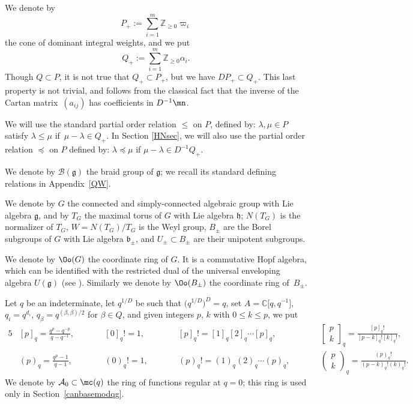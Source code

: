 We denote by
\[ P_+:= \sum_{i=1}^m \mathbb{Z}_{\geq 0} \varpi_i
\]
 the cone of dominant integral weights, and we put
 \[ Q_+:= \sum_{i=1}^m \mathbb{Z}_{\geq 0} \alpha_i.\]
 Though $Q\subset P$, it is not true that $Q_+\subset P_+$, but we have $DP_+ \subset Q_+$. This last property is not trivial, and follows from the classical fact that the inverse of the Cartan matrix~$(a_{ij})$ has coefficients in $D^{-1}\mn$.

We will use the standard partial order relation $\leq$ on $P$, defined by: $\lambda, \mu\in P$ satisfy $\lambda \leq \mu$ if~${\mu-\lambda \in Q_+}$. In Section \ref{HNsec}, we will also use the partial order relation $\preceq$ on $P$ defined by: $\lambda \preceq \mu$ if $\mu-\lambda \in D^{-1}Q_+$.

We denote by $\mathcal{B}(\mathfrak{g})$ the braid group of $\mathfrak{g}$; we recall its standard defining relations in Appendix~\ref{QW}.

We denote by $G$ the connected and simply-connected algebraic group with Lie algebra $\mathfrak{g}$, and by $T_G$ the maximal torus of $G$ with Lie algebra $\mathfrak{h}$; $N(T_G)$ is the normalizer of $T_G$, $W = N(T_G)/T_G$ is the Weyl group, $B_\pm$ are the Borel subgroups of $G$ with Lie algebra $\mathfrak{b}_\pm$, and $U_\pm \subset B_\pm$ are their unipotent subgroups.

We denote by $\Oo(G)$ the coordinate ring of $G$. It is a commutative Hopf algebra, which can be identified with the restricted dual of the universal enveloping algebra $U(\mathfrak{g})$ (see \cite{Ko,Lusztig3}). Similarly we denote by $\Oo(B_\pm)$ the coordinate ring of~$B_\pm$.

Let $q$ be an indeterminate, let $q^{1/D}$ be such that $\bigl(q^{1/D}\bigr)^D=q$, set $A={\mathbb C}\big[q,q^{-1}\big]$, $q_i=q^{d_i}$, $q_\beta = q^{(\beta,\beta)/2}$ for $\beta\in Q$, and given integers $p$, $k$ with $0\leq k\leq p$, we put
\begin{alignat*}{5}
 & [p]_q = \frac{q^p-q^{-p}}{q- q^{-1}} ,\qquad &&[0]_q! =1,\qquad &&[p]_q! =[1]_q[2]_q\cdots [p]_q ,\qquad &&\left[\begin{matrix} p \\ k \end{matrix}\right]_{q} =\frac{[p]_q! }{[p-k]_q![k]_q!},&\\
& (p)_q = \frac{q^p-1}{q- 1} ,\qquad&& (0)_q! =1 ,\qquad&& (p)_q! =(1)_q(2)_q\cdots (p)_q,\qquad &&\left(\begin{matrix} p \\ k \end{matrix}\right)_{q} =\frac{(p)_q! }{(p-k)_q!(k)_q!}.&
\end{alignat*}
We denote by $\mathcal{A}_0\subset \mc(q)$ the ring of functions regular at $q=0$; this ring is used only in Section~\ref{canbasemodqg}.

